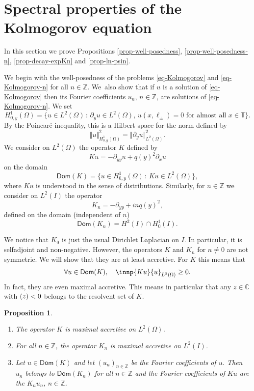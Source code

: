 \documentclass[JEP,XML,SOM,Unicode]{cedram}
\theoremstyle{plain}
\newtheorem{proposition}[theorem]{Proposition}
\theoremstyle{definition}
\newcommand{\nr}[1]{\Vert #1\Vert}
\newcommand{\set}[1]{\{ #1\}}
\newcommand{\1}{\mathds 1}
\newcommand{\st}{\,:\,}
\let\Re\relax
\DeclareMathOperator{\Re}{\mathsf{Re}\mkern2mu}
\newcommand{\Dom}{\mathsf{Dom}}
\def\C{\mathbb{C}}
\newcommand{\Z}{\mathbb{Z}}
\newcommand{\T}{\mathbb{T}}
\let\O\Omega
\begin{document}
\section{Spectral properties of the Kolmogorov equation} \label{sec-spectral}

In this section we prove Propositions \ref{prop-well-posedness}, \ref{prop-well-posedness-n}, \ref{prop-decay-expKn} and \ref{prop-ln-psin}.

 \label{sec-wellposedness-proof}

We begin with the well-posedness of the problems \eqref{eq-Kolmogorov} and \eqref{eq-Kolmogorov-n} for all $n \in \Z$. We~also show that if $u$ is a solution of \eqref{eq-Kolmogorov} then its Fourier coefficients $u_n$, $n\in\Z$, are solutions of \eqref{eq-Kolmogorov-n}. We set
\[
H^1_{0,y}(\O) = \bigl\{u \in L^2(\O) \st \partial_y u \in L^2(\O),\, u(x ,\ell_\pm) = 0 \text{ for almost all } x \in \T \bigr\}.
\]
By the Poincaré inequality, this is a Hilbert space for the norm defined by
\[
\nr{u}_{H^1_{0,y}(\O)}^2 = \nr{\partial_y u}_{L^2(\O)}^2.
\]
We consider on $L^2(\O)$ the operator $K$ defined by
\[
Ku = -\partial_{yy} u + q(y)^2 \partial_x u
\]
on the domain
\[
\Dom(K) = \set{u \in H^1_{0,y}(\O) \st K u \in L^2(\O)},
\]
where $Ku$ is understood in the sense of distributions. Similarly, for $n \in \Z$ we consider on $L^2(I)$ the operator
\begin{equation} \label{def-Kn}
K_n = -\partial_{yy} + i n q(y)^2,
\end{equation}
defined on the domain (independent of $n$)
\begin{equation} \label{dom-Kn}
\Dom(K_n) = H^2(I) \cap H_0^1(I).
\end{equation}

We notice that $K_0$ is just the usual Dirichlet Laplacian on $I$. In particular, it is selfadjoint and non-negative. However, the operators $K$ and $K_n$ for $n \neq 0$ are not symmetric. We will show that they are at least accretive. For $K$ this means that
\[
\forall u \in \Dom(K), \quad \Re \innp{K u}{u}_{L^2(\O)} \geq 0.
\]
In fact, they are even maximal accretive. This means in particular that any $z \in \C$ with $\Re(z) < 0$ belongs to the resolvent set of $K$.

\skpt
\begin{proposition}
\begin{enumerate}
\item The operator $K$ is maximal accretive on $L^2(\O)$.
\item For all $n \in \Z$, the operator $K_n$ is maximal accretive on $L^2(I)$.
\item Let $u \in \Dom(K)$ and let $(u_n)_{n \in \Z}$ be the Fourier coefficients of $u$. Then $u_n$ belongs to $\Dom(K_n)$ for all $n \in \Z$ and the Fourier coefficients of $Ku$ are the $K_n u_n$, $n \in \Z$.
\end{enumerate}
\label{prop-K-Kn}
\end{proposition}
\end{document}
